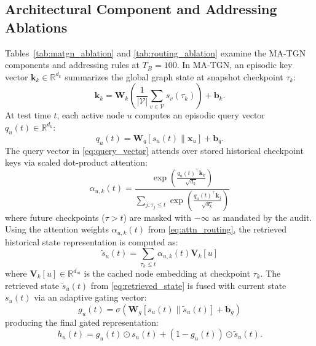 \documentclass[conference]{IEEEtran}
\begin{document}
\subsection{Architectural Component and Addressing Ablations}
Tables~\ref{tab:matgn_ablation} and \ref{tab:routing_ablation} examine the MA-TGN components and addressing rules at $T_B=100$. In MA-TGN, an episodic key vector $\mathbf{k}_k \in \mathbb{R}^{d_k}$ summarizes the global graph state at snapshot checkpoint $\tau_k$:
\begin{equation}
\label{eq:key_vector}
\mathbf{k}_k = \mathbf{W}_k \left( \frac{1}{|\mathcal{V}|} \sum_{v \in \mathcal{V}} s_v(\tau_k) \right) + \mathbf{b}_k.
\end{equation}
At test time $t$, each active node $u$ computes an episodic query vector $q_u(t) \in \mathbb{R}^{d_k}$:
\begin{equation}
\label{eq:query_vector}
q_u(t) = \mathbf{W}_q [s_u(t) \parallel \mathbf{x}_u] + \mathbf{b}_q.
\end{equation}
The query vector in \eqref{eq:query_vector} attends over stored historical checkpoint keys via scaled dot-product attention:
\begin{equation}
\label{eq:attn_routing}
\alpha_{u,k}(t) = \frac{\exp\left( \frac{q_u(t)^\top \mathbf{k}_k}{\sqrt{d_k}} \right)}{\sum_{j: \tau_j \le t} \exp\left( \frac{q_u(t)^\top \mathbf{k}_j}{\sqrt{d_k}} \right)}
\end{equation}
where future checkpoints ($\tau > t$) are masked with $-\infty$ as mandated by the audit. Using the attention weights $\alpha_{u,k}(t)$ from \eqref{eq:attn_routing}, the retrieved historical state representation is computed as:
\begin{equation}
\label{eq:retrieved_state}
\tilde{s}_u(t) = \sum_{\tau_k \le t} \alpha_{u,k}(t) \mathbf{V}_k[u]
\end{equation}
where $\mathbf{V}_k[u] \in \mathbb{R}^{d_m}$ is the cached node embedding at checkpoint $\tau_k$. The retrieved state $\tilde{s}_u(t)$ from \eqref{eq:retrieved_state} is fused with current state $s_u(t)$ via an adaptive gating vector:
\begin{equation}
\label{eq:gating_vector}
g_u(t) = \sigma\left(\mathbf{W}_g [s_u(t) \parallel \tilde{s}_u(t)] + \mathbf{b}_g\right)
\end{equation}
producing the final gated representation:
\begin{equation}
\label{eq:fused_rep}
h_u(t) = g_u(t) \odot s_u(t) + (1 - g_u(t)) \odot \tilde{s}_u(t).
\end{equation}
\end{document}
